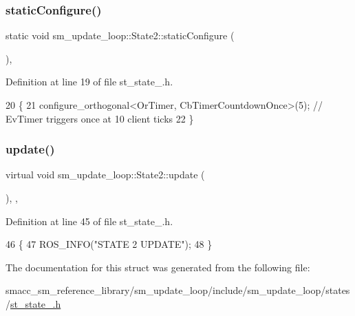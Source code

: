 \subsubsection{\texorpdfstring{static\+Configure()}{staticConfigure()}}
{\footnotesize\ttfamily static void sm\+\_\+update\+\_\+loop\+::\+State2\+::static\+Configure (\begin{DoxyParamCaption}{ }\end{DoxyParamCaption})\hspace{0.3cm}{\ttfamily [inline]}, {\ttfamily [static]}}



Definition at line 19 of file st\+\_\+state\+\_.\+h.


\begin{DoxyCode}
20     \{
21         configure\_orthogonal<OrTimer, CbTimerCountdownOnce>(5); \textcolor{comment}{// EvTimer triggers once at 10 client ticks}
22     \}
\end{DoxyCode}
\mbox{\label{structsm__update__loop_1_1State2_aab947246406d3225de2f83f336ae24a3}} 
\subsubsection{\texorpdfstring{update()}{update()}}
{\footnotesize\ttfamily virtual void sm\+\_\+update\+\_\+loop\+::\+State2\+::update (\begin{DoxyParamCaption}{ }\end{DoxyParamCaption})\hspace{0.3cm}{\ttfamily [inline]}, {\ttfamily [override]}, {\ttfamily [virtual]}}



Definition at line 45 of file st\+\_\+state\+\_.\+h.


\begin{DoxyCode}
46     \{
47         ROS\_INFO(\textcolor{stringliteral}{"STATE 2 UPDATE"});
48     \}
\end{DoxyCode}


The documentation for this struct was generated from the following file\+:\begin{DoxyCompactItemize}
\item 
smacc\+\_\+sm\+\_\+reference\+\_\+library/sm\+\_\+update\+\_\+loop/include/sm\+\_\+update\+\_\+loop/states/\hyperlink{sm__update__loop_2include_2sm__update__loop_2states_2st__state__2_8h}{st\+\_\+state\+\_.\+h}\end{DoxyCompactItemize}
